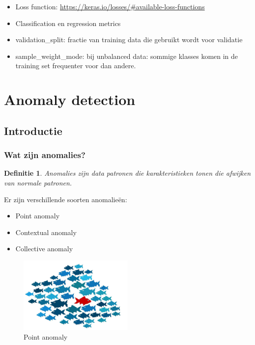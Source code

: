 \documentclass{article}
\newtheorem{theorem}{Definitie}[section]
\begin{document}
\begin{itemize}
    \item Loss function: \url{https://keras.io/losses/#available-loss-functions}
    \item Classification en regression metrics
    \item validation\_split: fractie van training data die gebruikt wordt voor validatie
    \item sample\_weight\_mode: bij unbalanced data: sommige klasses komen in de training set frequenter voor dan andere.
\end{itemize}

\section{Anomaly detection}

\subsection{Introductie}
\subsubsection{Wat zijn anomalies?}

\begin{theorem}
    Anomalies zijn data patronen die karakteristieken tonen
    die afwijken van normale patronen.
\end{theorem}

Er zijn verschillende soorten anomalieën:

\begin{itemize}
    \item Point anomaly
    \item Contextual anomaly
    \item Collective anomaly
\end{itemize}

\begin{figure}[H]
    \centering
    \includegraphics[width=0.5\textwidth]{anomaly-point.png}
    \caption{Point anomaly}
\end{figure}
\end{document}
